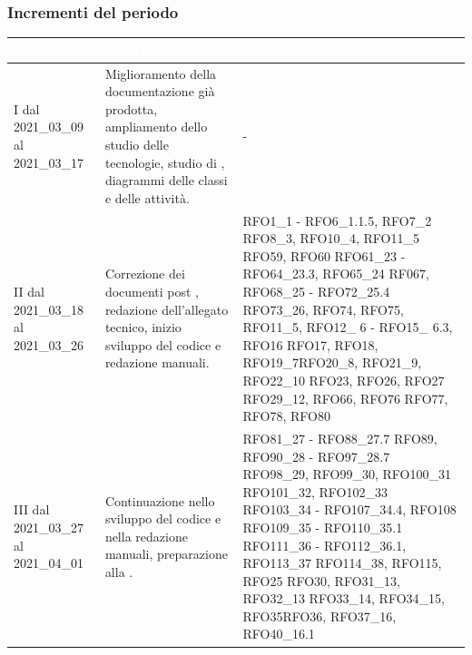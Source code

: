 \subsubsection{Incrementi del periodo}\label{IncrementiPDettaglio}
\begin{table}[H]
	\begin{center}
		\begin{tabular}{ |C{3cm} C{6cm} C{7cm}| }
			\textcolor{white}{\textbf{Incremento}} & \textcolor{white}{\textbf{Obiettivi}} & \textcolor{white}{\textbf{Requisiti}} \\ \hline
			I dal 2021\_03\_09 al 2021\_03\_17& Miglioramento della documentazione già prodotta, ampliamento dello studio delle tecnologie, studio di , diagrammi delle classi e delle attività.  & - \\ \hline
			II dal 2021\_03\_18 al 2021\_03\_26 	& Correzione dei documenti post , redazione dell'allegato tecnico, inizio sviluppo del codice e redazione manuali. &  
			RFO1\_1 - RFO6\_1.1.5, RFO7\_2 \newline
			RFO8\_3, RFO10\_4, RFO11\_5 \newline
			RFO59, RFO60 \newline
			RFO61\_23 - RFO64\_23.3, RFO65\_24 \newline
			RF067, RFO68\_25 - RFO72\_25.4 \newline
			RFO73\_26, RFO74, RFO75, RFO11\_5, \newline 
			RFO12\_ 6 - RFO15\_ 6.3, RFO16 \newline RFO17, RFO18, RFO19\_7\newline RFO20\_8, RFO21\_9, RFO22\_10 \newline RFO23, RFO26, RFO27 \newline RFO29\_12, RFO66, RFO76 \newline RFO77, RFO78, RFO80 \\ \hline
			III dal 2021\_03\_27 al 2021\_04\_01 	& Continuazione nello sviluppo del codice e nella redazione manuali, preparazione alla . & RFO81\_27 - RFO88\_27.7 \newline
			RFO89, RFO90\_28 - RFO97\_28.7 \newline
			RFO98\_29, RFO99\_30, RFO100\_31 \newline
			RFO101\_32, RFO102\_33 \newline
			RFO103\_34 - RFO107\_34.4, RFO108 \newline
			RFO109\_35 - RFO110\_35.1\newline
			RFO111\_36 - RFO112\_36.1, RFO113\_37 \newline RFO114\_38, RFO115, RFO25 \newline RFO30, RFO31\_13, RFO32\_13 \newline RFO33\_14, RFO34\_15, RFO35\newline  RFO36, RFO37\_16, RFO40\_16.1 \\ \hline

\end{tabular}
\end{center}
\end{table}
